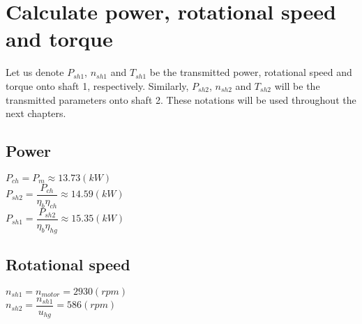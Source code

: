 \section{Calculate power, rotational speed and torque}
Let us denote $ P_{sh1} $, $ n_{sh1} $ and $ T_{sh1} $ be the transmitted power, rotational speed and torque onto shaft 1, respectively. Similarly, $ P_{sh2} $, $ n_{sh2} $ and $ T_{sh2} $ will be the transmitted parameters onto shaft 2. These notations will be used throughout the next chapters.
\subsection{Power}
$ P_{ch} = P_m \approx 13.73 \unit{(kW)}$\\
$ P_{sh2} = \dfrac{P_{ch}}{\eta_b\eta_{ch}} \approx 14.59 \unit{(kW)}$\\
$ P_{sh1} = \dfrac{P_{sh2}}{\eta_b\eta_{hg}} \approx 15.35 \unit{(kW)}$
\subsection{Rotational speed}
$ n_{sh1} = n_{motor} = 2930\unit{(rpm)}$\\
$ n_{sh2} = \dfrac{n_{sh1}}{u_{hg}} = 586 \unit{(rpm)}$
